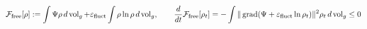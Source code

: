 \documentclass[preview]{standalone}
\begin{document}
\begin{align*}
\special{dvisvgm:raw <g id='unique000'>}\mathcal{F}_{\text{free}}[\rho] := \int \Psi\rho\,d\operatorname{vol}_g + \varepsilon_{\text{fluct}}\int \rho\ln\rho\,d\operatorname{vol}_g, \qquad \frac{d}{dt}\mathcal{F}_{\text{free}}[\rho_t] = -\int \|\operatorname{grad}(\Psi+\varepsilon_{\text{fluct}}\ln\rho_t)\|^2\rho_t\,d\operatorname{vol}_g \le 0\special{dvisvgm:raw </g>}
\end{align*}
\end{document}
